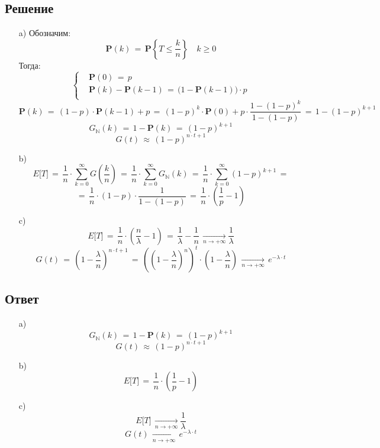 \documentclass{article}
\begin{document}
\subsection*{Решение}
\begin{enumerate}
\item[a)] Обозначим:
\[ \mathbf{P}(k) \, = \, \mathbf{P} \left\{ T \! \leqslant \! \dfrac{k}{n} \right\} \quad k \! \geqslant \! 0 \]
Тогда:
\begin{equation*}
\left\{
\begin{aligned}
& \mathbf{P}(0) \, = \, p \\
& \mathbf{P}(k) \! - \! \mathbf{P}(k \! - \! 1) \, = \, \big( 1 \! - \! \mathbf{P}(k \! - \! 1) \big) \! \cdot \! p \\
\end{aligned}
\right.
\end{equation*}
\[ \mathbf{P}(k) \, = \, (1 \! - \! p) \! \cdot \! \mathbf{P}(k \! - \! 1) \! + \! p \, = \, {(1 \! - \! p)}^k \! \cdot \! \mathbf{P}(0) \! + \! p \! \cdot \! \dfrac{1 \! - \! {(1 \! - \! p)}^k}{1 \! - \! (1 \! - \! p)} \, = \, 1 \! - \! {(1 \! - \! p)}^{k+1} \]
\[ G_\mathbb{N}(k) \, = \, 1 \! - \! \mathbf{P}(k) \, = \, {(1 \! - \! p)}^{k+1} \]
\[ G(t) \, \approx \, {(1 \! - \! p)}^{n \cdot t+1} \]
\item[b)]
\[ E \big[ T \big] \, = \, \dfrac{1}{n} \! \cdot \! \sum\limits_{k=0}^\infty G \left( \dfrac{k}{n} \right) \, = \, \dfrac{1}{n} \! \cdot \! \sum\limits_{k=0}^\infty G_\mathbb{N} (k) \, = \, \dfrac{1}{n} \! \cdot \! \sum\limits_{k=0}^\infty {(1 \! - \! p)}^{k+1} \, = \]
\[ = \, \dfrac{1}{n} \! \cdot \! (1 \! - \! p) \! \cdot \! \dfrac{1}{1 \! - \! (1 \! - \! p)} \, = \, \dfrac{1}{n} \! \cdot \! \left( \dfrac{1}{p} \! - \! 1 \right) \]
\item[c)]
\[ E \big[ T \big] \, = \, \dfrac{1}{n} \! \cdot \! \left( \dfrac{n}{\lambda} \! - \! 1 \right) \, = \, \dfrac{1}{\lambda} \! - \! \dfrac{1}{n} \, \underset{n \rightarrow +\infty}{\longrightarrow} \dfrac{1}{\lambda} \]
\[ G(t) \, = \, {\left( 1 \! - \! \dfrac{\lambda}{n} \right)}^{n \cdot t + 1} \, = \, {\left( {\left( 1 \! - \! \dfrac{\lambda}{n} \right)}^n \right)}^t \! \cdot \! \left( 1 \! - \! \dfrac{\lambda}{n} \right) \, \underset{n \rightarrow +\infty}{\longrightarrow} \, e^{-\lambda \cdot t} \]
\end{enumerate}
\subsection*{Ответ}
\begin{enumerate}
\item[a)]
\[ G_\mathbb{N}(k) \, = \, 1 \! - \! \mathbf{P}(k) \, = \, {(1 \! - \! p)}^{k+1} \]
\[ G(t) \, \approx \, {(1 \! - \! p)}^{n \cdot t+1} \]
\item[b)]
\[ E \big[ T \big] \, = \, \dfrac{1}{n} \! \cdot \! \left( \dfrac{1}{p} \! - \! 1 \right) \]
\item[c)]
\[ E \big[ T \big] \, \underset{n \rightarrow +\infty}{\longrightarrow} \dfrac{1}{\lambda} \]
\[ G(t) \, \underset{n \rightarrow +\infty}{\longrightarrow} \, e^{-\lambda \cdot t} \]
\end{enumerate}
\end{document}
